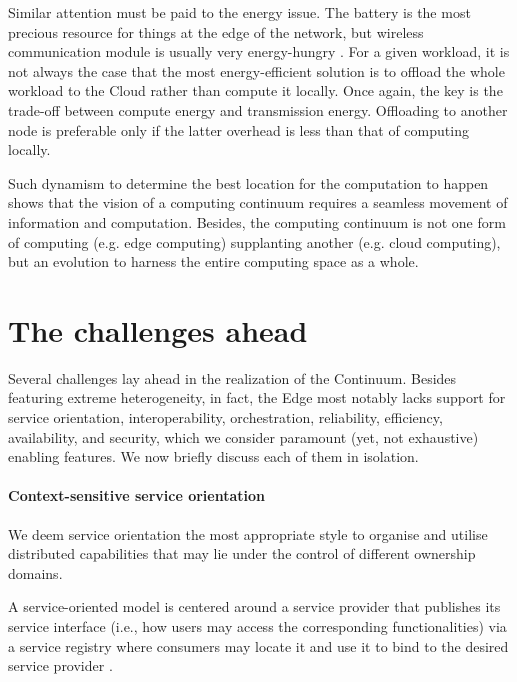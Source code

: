 Similar attention must be paid to the energy issue. 
The battery is the most precious resource for things at the edge of the network, but wireless communication module is usually very energy-hungry \cite{shi2016edge}. For a given workload, it is not always the case that the most energy-efficient solution is to offload the whole workload to the Cloud rather than compute it locally. 
Once again, the key is the trade-off between compute energy and transmission energy. Offloading to another node is preferable only if the latter overhead is less than that of computing locally.

Such dynamism to determine the best location for the computation to happen shows that the vision of a computing continuum requires a seamless movement of information and computation. Besides, the computing continuum is not one form of computing (e.g. edge computing) supplanting another (e.g. cloud computing), but an evolution to harness the entire computing space as a whole.

\section{The challenges ahead}
\label{sec:challenges}

Several challenges lay ahead in the realization of the Continuum. 
Besides featuring extreme heterogeneity, in fact, the Edge most notably lacks support for service orientation, interoperability, orchestration, reliability, efficiency, availability, and security, which we consider paramount (yet, not exhaustive) enabling features. 
We now briefly discuss each of them in isolation. 

\paragraph{Context-sensitive service orientation}
We deem service orientation the most appropriate style to organise and utilise distributed capabilities that may lie under the control of different ownership domains. 

A service-oriented model is centered around a service provider that publishes its service interface (i.e., how users may access the corresponding functionalities) via a service registry where consumers may locate it and use it to bind to the desired service provider \cite{haller2008internet}.

